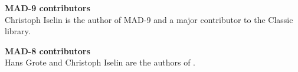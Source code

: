{\bf MAD-9 contributors}\\
Christoph Iselin is the author of MAD-9 and a major contributor to the Classic library.

{\bf MAD-8 contributors}\\
Hans Grote and Christoph Iselin are the authors of \madeight.

\newpage

